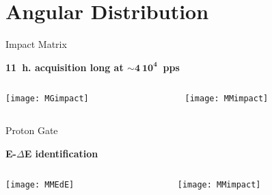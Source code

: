 \section{Angular Distribution}

\begin{frame}{Impact Matrix}
    	\vspace{-0.05\textheight}
    \begin{overlayarea}{\textwidth}{0.1\textheight}
	\centering
	\textbf{11~h. acquisition long at $\mathbf{\sim 4\ 10^{4}}$~pps}
	\end{overlayarea}
	\begin{columns}
		\begin{column}{0.5\textwidth}
			\begin{overlayarea}{\textwidth}{\textheight}
				\centering
				\texttt{[image: MGimpact]}
			\end{overlayarea}
		\end{column}
		\begin{column}{0.5\textwidth}
			\begin{overlayarea}{\textwidth}{\textheight}
				\centering       
				\texttt{[image: MMimpact]}\\
		    \end{overlayarea}	
		\end{column}
	\end{columns}
\end{frame}

\begin{frame}{Proton Gate}
    	\vspace{-0.05\textheight}
    \begin{overlayarea}{\textwidth}{0.1\textheight}
	\centering
	\textbf{E-$\Delta$E identification}
	\end{overlayarea}	
	\begin{columns}
		\begin{column}{0.5\textwidth}
			\begin{overlayarea}{\textwidth}{\textheight}
				\centering
				\vspace{0.015\textheight}
				\texttt{[image: MMEdE]}
			\end{overlayarea}
		\end{column}
		\begin{column}{0.5\textwidth}
			\begin{overlayarea}{\textwidth}{\textheight}
				\centering       
				\texttt{[image: MMimpact]}\\
		    \end{overlayarea}	
		\end{column}
	\end{columns}
\end{frame}

